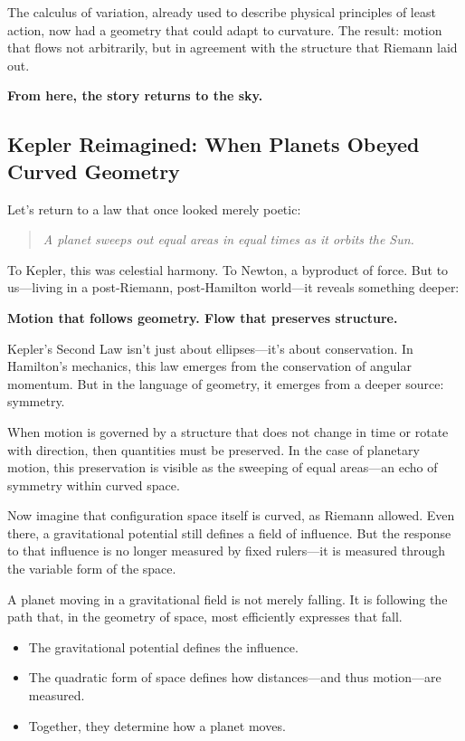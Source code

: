 The calculus of variation, already used to describe physical principles of least action, now had a geometry that could adapt to curvature. The result: motion that flows not arbitrarily, but in agreement with the structure that Riemann laid out.

\textbf{From here, the story returns to the sky.}

\subsection{Kepler Reimagined: When Planets Obeyed Curved Geometry}

Let’s return to a law that once looked merely poetic:

\begin{quote}
\textit{A planet sweeps out equal areas in equal times as it orbits the Sun.}
\end{quote}

To Kepler, this was celestial harmony. To Newton, a byproduct of force.  
But to us—living in a post-Riemann, post-Hamilton world—it reveals something deeper:

\textbf{Motion that follows geometry. Flow that preserves structure.}

Kepler’s Second Law isn’t just about ellipses—it’s about conservation. In Hamilton’s mechanics, this law emerges from the conservation of angular momentum. But in the language of geometry, it emerges from a deeper source: symmetry.

When motion is governed by a structure that does not change in time or rotate with direction, then quantities must be preserved. In the case of planetary motion, this preservation is visible as the sweeping of equal areas—an echo of symmetry within curved space.

Now imagine that configuration space itself is curved, as Riemann allowed. Even there, a gravitational potential still defines a field of influence. But the response to that influence is no longer measured by fixed rulers—it is measured through the variable form of the space.

A planet moving in a gravitational field is not merely falling. It is following the path that, in the geometry of space, most efficiently expresses that fall.

\begin{itemize}
  \item The gravitational potential defines the influence.
  \item The quadratic form of space defines how distances—and thus motion—are measured.
  \item Together, they determine how a planet moves.
\end{itemize}

